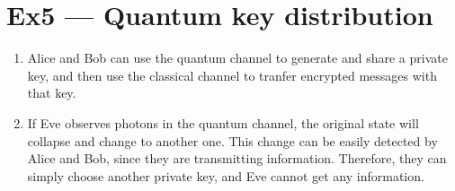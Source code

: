 \documentclass[12pt, a4paper]{article}
\begin{document}
\section*{Ex5 --- Quantum key distribution}
\begin{enumerate}
    \item Alice and Bob can use the quantum channel to generate and share a private key, 
          and then use the classical channel to tranfer encrypted messages with that key.
    \item If Eve observes photons in the quantum channel, the original state will collapse and change to another one. 
          This change can be easily detected by Alice and Bob, since they are transmitting information. Therefore, 
          they can simply choose another private key, and Eve cannot get any information.
\end{enumerate} 
\end{document}
